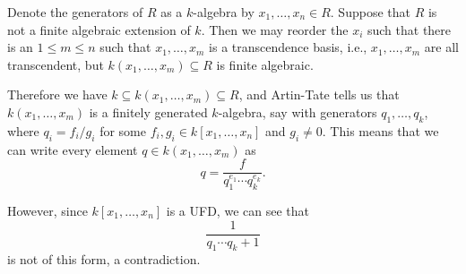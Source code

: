 Denote the generators of $R$ as a $k$-algebra by $x_1, \ldots, x_n \in R$. Suppose
that $R$ is not a finite algebraic extension of $k$. Then we may reorder the
$x_i$ such that there is an $1\leq m\leq n$ such that $x_1, \ldots, x_m$ is
a transcendence basis, i.e., $x_1, \ldots, x_m$ are all transcendent, but
$k(x_1, \ldots, x_m) \subseteq R$ is finite algebraic.

Therefore we have $k \subseteq k(x_1, \ldots, x_m) \subseteq R$, and Artin-Tate
tells us that $k(x_1, \ldots, x_m)$ is a finitely generated $k$-algebra, say
with generators $q_1, \ldots, q_k$, where $q_i = f_i/g_i$ for some
$f_i, g_i \in k[x_1, \ldots, x_n]$ and $g_i\neq 0$.
This means that we can write every element $q \in k(x_1, \ldots, x_m)$ as
\[ q = \frac{f}{q_1^{e_1}\cdots q_k^{e_k}}. \]

However, since $k[x_1, \ldots, x_n]$ is a UFD, we can see that
\[ \frac{1}{q_1\cdots q_k + 1} \]
is not of this form, a contradiction.
